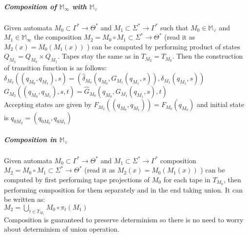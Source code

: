 \documentclass[12pt]{article}
\begin{document}
\subparagraph{Composition of $\mathbb{M}_\infty$ with $\mathbb{M}_\vee$} Given automata $M_0 \subset \Gamma^* \rightarrow \Theta^* $ and $M_1 \subset \Sigma^* \rightarrow \Gamma^*$ such that  $M_0 \in \mathbb{M}_\vee$ and $M_1 \in \mathbb{M}_\infty$ the composition $M_2=M_0 \circ M_1 \subset \Sigma^* \rightarrow \Theta^*$ (read it as $M_2(x) = M_0(M_1(x))$ ) can be computed by performing product of states $Q_{M_2} = Q_{M_0} \times Q_{M_1}$. Tapes stay the same as in $T_{M_2} = T_{M_0}$. Then the construction of transition function is as follows:\\
$\delta_{M_2}((q_{M_0},q_{M_1}),s) = 
( \hat{\delta}_{M_0}(q_{M_0},G_{M_1}(q_{M_1},s) ) , \delta_{M_1}(q_{M_1},s) )
$\\
$G_{M_2}((q_{M_0},q_{M_1}),s,t) = \hat{G}_{M_0}(q_{M_0}, G_{M_1}(q_{M_1},s),t )
$\\
Accepting states are given by $F_{M_2}((q_{M_0},q_{M_1})) = F_{M_0}(q_{M_0})$ and initial state is $q_{0M_2} = (q_{0M_0},q_{0M_1})$


\subparagraph{Composition in $\mathbb{M}_\vee$} Given automata $M_0 \subset \Gamma^* \rightarrow \Theta^* $ and $M_1 \subset \Sigma^* \rightarrow \Gamma^*$ composition $M_2=M_0 \circ M_1 \subset \Sigma^* \rightarrow \Theta^*$ (read it as $M_2(x) = M_0(M_1(x))$ ) can be computed by first performing tape projections of $M_0$ for each tape in $T_{M_0}$, then performing composition for them separately and in the end taking union. It can be written as: \\
$M_2 = \bigcup_{t\in T_{M_1}} M_0 \circ \pi_t(M_1)$ \\
Composition is guaranteed to preserve determinism so there is no need to worry about determinism of union operation.
\end{document}
